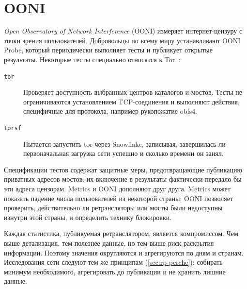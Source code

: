 \section{OONI}\label{sec:metrics-ooni}

\emph{Open Observatory of Network Interference} (OONI) измеряет интернет-цензуру с точки зрения пользователей. Добровольцы по всему миру устанавливают OONI Probe, который периодически выполняет тесты и публикует открытые результаты. Некоторые тесты специально относятся к Tor~\cite{oonitor}:
\begin{description}
  \item[\texttt{tor}] Проверяет доступность выбранных центров каталогов и мостов. Тесты не ограничиваются установлением TCP-соединения и выполняют действия, специфичные для протокола, например рукопожатие obfs4.
  \item[\texttt{torsf}] Пытается запустить tor через Snowflake, записывая, завершилась ли первоначальная загрузка сети успешно и сколько времени он занял.
\end{description}
Спецификации тестов содержат защитные меры, предотвращающие публикацию приватных адресов мостов: их включение в результаты фактически передало бы эти адреса цензорам. Metrics и OONI дополняют друг друга. Metrics может показать падение числа пользователей из некоторой страны; OONI позволяет проверить, действительно ли ретрансляторы или мосты были недоступны изнутри этой страны, и определить технику блокировки.

\begin{approfondimento}
Каждая статистика, публикуемая ретранслятором, является компромиссом. Чем выше детализация, тем полезнее данные, но тем выше риск раскрытия информации. Поэтому значения округляются и агрегируются по дням и странам. Исследования сети следуют тем же принципам (\cref{sec:rp-perche}): собирать минимум необходимого, агрегировать до публикации и не хранить лишние данные.
\end{approfondimento}

